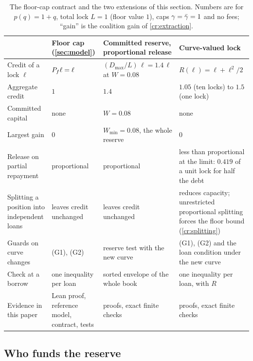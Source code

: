 \begin{table}[t]
\centering\small
\caption{The floor-cap contract and the two extensions of this section. Numbers are for $p(q)=1+q$, total lock $L=1$ (floor value $1$), caps $\gamma=\bar\gamma=1$ and no fees; ``gain'' is the coalition gain of \cref{cr:extraction}.}\label{tab:contracts}
\begin{tabularx}{\textwidth}{@{}>{\raggedright\arraybackslash}p{}>{\raggedright\arraybackslash}X>{\raggedright\arraybackslash}X>{\raggedright\arraybackslash}X@{}}
\toprule
 & Floor cap (\cref{sec:model}) & Committed reserve, proportional release & Curve-valued lock\\
\midrule
Credit of a lock $\ell$ & $P_f\ell=\ell$ & $(D_{\max}/L)\,\ell=1.4\,\ell$ at $W=0.08$ & $R(\ell)=\ell+\ell^2/2$\\
Aggregate credit & $1$ & $1.4$ & $1.05$ (ten locks) to $1.5$ (one lock)\\
Committed capital & none & $W=0.08$ & none\\
Largest gain & $0$ & $W_{\min}=0.08$, the whole reserve & $0$\\
Release on partial repayment & proportional & proportional & less than proportional at the limit: $0.419$ of a unit lock for half the debt\\
Splitting a position into independent loans & leaves credit unchanged & leaves credit unchanged & reduces capacity; unrestricted proportional splitting forces the floor bound (\cref{cr:splitting})\\
Guards on curve changes & (G1), (G2) & reserve test with the new curve & (G1), (G2) and the loan condition under the new curve\\
Check at a borrow & one inequality per loan & sorted envelope of the whole book & one inequality per loan, with $R$\\
Evidence in this paper & Lean proof, reference model, contract, tests & proofs, exact finite checks & proofs, exact finite checks\\
\bottomrule
\end{tabularx}
\end{table}

\subsection{Who funds the reserve}


